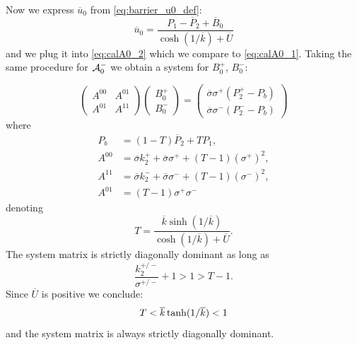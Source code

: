 \documentclass{elsarticle}
\def\ol#1{\overline{#1}}
\begin{document}
Now we express $\ol{u}_0$ from \eqref{eq:barrier_u0_def}:
\begin{equation}
    \label{eq:barrier_u0}
    \ol{u}_0 = \frac{P_1 - \ol{P}_2 + \ol{B}_0}{\cosh(1/\ol{k}) + \ol{U}}
\end{equation}
and we plug it into  \eqref{eq:calA0_2} which we compare to \eqref{eq:calA0_1}. Taking the same procedure for ${\cal A}_0^-$ we
obtain a system for $B_0^+$, $B_0^-$:

\begin{equation}
    \label{eq:B0_system}
    \begin{pmatrix} 
            A^{00} & A^{01} \\ 
            A^{01} & A^{11}
    \end{pmatrix}
    \begin{pmatrix} 
        B_0^+  \\ 
        B_0^-     
    \end{pmatrix}
     =  
    \begin{pmatrix} 
        \ol{\sigma}\sigma^+(P^+_2 - P_b) \\ 
        \ol{\sigma}\sigma^-(P^-_2 - P_b)
    \end{pmatrix}
\end{equation}
where
\begin{align}
    P_b &= (1-T) \ol{P}_2 + T P_1, \\
    A^{00} &= \ol{\sigma}k_2^+  + \ol{\sigma}\sigma^+ +(T-1)(\sigma^+)^2, \\
    A^{11} &= \ol{\sigma}k_2^-  + \ol{\sigma}\sigma^- +(T-1)(\sigma^-)^2, \\
    A^{01} &= (T-1)\sigma^+\sigma^-    
\end{align}
denoting
\[
    T  = \frac{\ol{k}\sinh( 1/\ol{k} )}{\cosh(1/\ol{k}) + \ol{U}}.
\]
The system matrix is strictly diagonally dominant as long as 
\[
    \frac{k_2^{+/-}}{\sigma^{+/-}} + 1 > 1 > T -1.
\]
Since $\ol{U}$ is positive we conclude:
\[
    T < \ol{k}\, {\rm tanh}( 1/\ol{k} ) < 1
\]
and the system matrix is always strictly diagonally dominant.


% 
% 
% 
% 
% 
\end{document}
